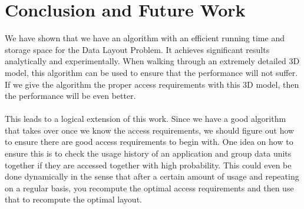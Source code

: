 \documentclass[conference]{acmsiggraph}
\begin{document}
\section{Conclusion and Future Work}

We have shown that we have an algorithm with an efficient running time and storage space for the Data Layout Problem. It achieves significant results analytically and experimentally. When walking through an extremely detailed 3D model, this algorithm can be used to ensure that the performance will not suffer. If we give the algorithm the proper access requirements with this 3D model, then the performance will be even better.\\
\\
This leads to a logical extension of this work. Since we have a good algorithm that takes over once we know the access requirements, we should figure out how to ensure there are good access requirements to begin with. One idea on how to ensure this is to check the usage history of an application and group data units together if they are accessed together with high probability. This could even be done dynamically in the sense that after a certain amount of usage and repeating on a regular basis, you recompute the optimal access requirements and then use that to recompute the optimal layout. 



\end{document}
